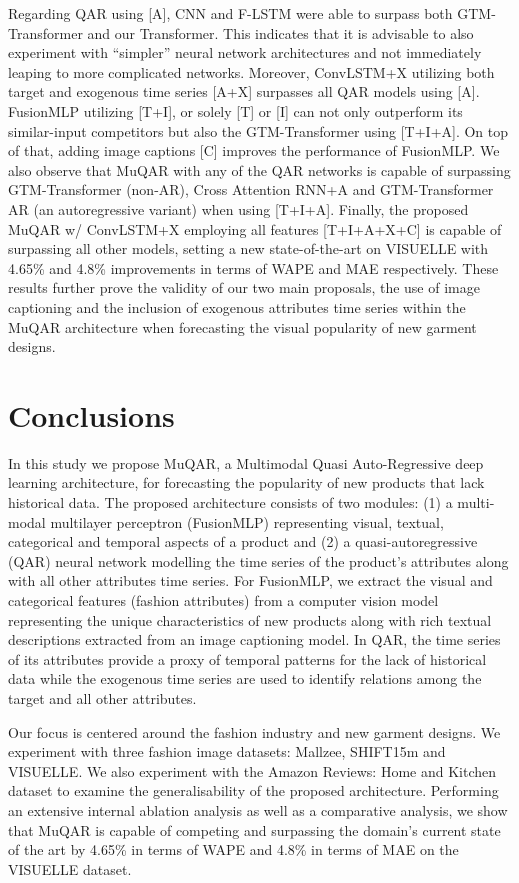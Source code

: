 \documentclass{article}
\begin{document}
Regarding QAR using [A], CNN and F-LSTM were able to surpass both GTM-Transformer and our Transformer. This indicates that it is advisable to also experiment with ``simpler'' neural network architectures and not immediately leaping to more complicated networks. Moreover, ConvLSTM+X utilizing both target and exogenous time series [A+X] surpasses all QAR models using [A]. 
FusionMLP utilizing [T+I], or solely [T] or [I] can not only outperform its similar-input competitors but also the GTM-Transformer using [T+I+A].
On top of that, adding image captions [C] improves the performance of FusionMLP. 
We also observe that MuQAR with any of the QAR networks is capable of surpassing GTM-Transformer (non-AR), Cross Attention RNN+A and GTM-Transformer AR (an autoregressive variant) when using [T+I+A]. Finally, the proposed MuQAR w/ ConvLSTM+X employing all features [T+I+A+X+C] is capable of surpassing all other models, setting a new state-of-the-art on VISUELLE with 4.65\% and 4.8\% improvements in terms of WAPE and MAE respectively. These results further prove the validity of our two main proposals, the use of image captioning and the inclusion of exogenous attributes time series within the MuQAR architecture when forecasting the visual popularity of new garment designs.

\section{Conclusions}
\label{section:conclusion}

In this study we propose MuQAR, a Multimodal Quasi Auto-Regressive deep learning architecture, for forecasting the popularity of new products that lack historical data.
The proposed architecture consists of two modules: (1) a multi-modal multilayer perceptron (FusionMLP) representing visual, textual, categorical and temporal aspects of a product and (2) a quasi-autoregressive (QAR) neural network modelling the time series of the product's attributes along with all other attributes time series. 
For FusionMLP, we extract the visual and categorical features (fashion attributes) from a computer vision model representing the unique characteristics of new products along with rich textual descriptions extracted from an image captioning model. 
In QAR, the time series of its attributes provide a proxy of temporal patterns for the lack of historical data while the exogenous time series are used to identify relations among the target and all other attributes.

Our focus is centered around the fashion industry and new garment designs. We experiment with three fashion image datasets: Mallzee, SHIFT15m and VISUELLE. We also experiment with the Amazon Reviews: Home and Kitchen dataset to examine the generalisability of the proposed architecture. 
Performing an extensive internal ablation analysis as well as a comparative analysis, we show that MuQAR is capable of competing and surpassing the domain's current state of the art by 4.65\% in terms of WAPE and 4.8\% in terms of MAE on the VISUELLE dataset.
\end{document}
